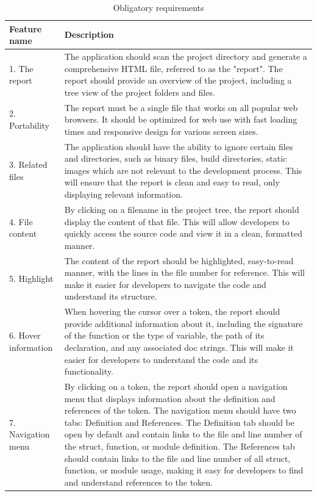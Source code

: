 \begin{longtable}{|p{1.5in}|p{4in}|}
\caption[Obligatory requirements]{Obligatory requirements}\label{table:must_req}\hline
Feature name & Description\\\hline
1. The report &
The application should scan the project directory and generate a comprehensive HTML file, referred to as the "report". The report should provide an overview of the project, including a tree view of the project folders and files.\\\hline

2. Portability & The report must be a single file that works on all popular web browsers. It should be optimized for web use with fast loading times and responsive design for various screen sizes. \\\hline

3. Related files & The application should have the ability to ignore certain files and directories, such as binary files, build directories, static images which are not relevant to the development process. This will ensure that the report is clean and easy to read, only displaying relevant information. \\\hline

4. File content & By clicking on a filename in the project tree, the report should display the content of that file. This will allow developers to quickly access the source code and view it in a clean, formatted manner. \\\hline

5. Highlight & The content of the report should be highlighted, easy-to-read manner, with the lines in the file number for reference. This will make it easier for developers to navigate the code and understand its structure. \\\hline

6. Hover information & When hovering the cursor over a token, the report should provide additional information about it, including the signature of the function or the type of variable, the path of its declaration, and any associated doc strings. This will make it easier for developers to understand the code and its functionality. \\\hline

7. Navigation menu & By clicking on a token, the report should open a navigation menu that displays information about the definition and references of the token. The navigation menu should have two tabs: Definition and References. The Definition tab should be open by default and contain links to the file and line number of the struct, function, or module definition. The References tab should contain links to the file and line number of all struct, function, or module usage, making it easy for developers to find and understand references to the token. \\\hline


\end{longtable}

